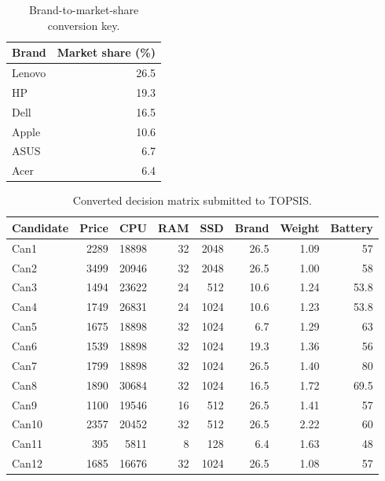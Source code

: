 \begin{table}[htbp]
  \centering
  \caption{Brand-to-market-share conversion key.}
  \label{tab:brand-share}
  \begin{tabular}{@{}lr@{}}
    \toprule
    Brand & Market share (\%) \\
    \midrule
    Lenovo & 26.5 \\
    HP     & 19.3 \\
    Dell   & 16.5 \\
    Apple  & 10.6 \\
    ASUS   & 6.7 \\
    Acer   & 6.4 \\
    \bottomrule
  \end{tabular}
\end{table}

\begin{table}[htbp]
\centering
\caption{Converted decision matrix submitted to TOPSIS.}
\label{tab:decision-matrix-converted}
\begin{tabular}{@{}lrrrrrrr@{}}
\toprule
Candidate & Price & CPU & RAM & SSD & Brand & Weight & Battery \\
\midrule
Can1  & 2289 & 18898 & 32 & 2048 & 26.5 & 1.09 & 57 \\
Can2  & 3499 & 20946 & 32 & 2048 & 26.5 & 1.00 & 58 \\
Can3  & 1494 & 23622 & 24 & 512 & 10.6 & 1.24 & 53.8 \\
Can4  & 1749 & 26831 & 24 & 1024 & 10.6 & 1.23 & 53.8 \\
Can5  & 1675 & 18898 & 32 & 1024 & 6.7 & 1.29 & 63 \\
Can6  & 1539 & 18898 & 32 & 1024 & 19.3 & 1.36 & 56 \\
Can7  & 1799 & 18898 & 32 & 1024 & 26.5 & 1.40 & 80 \\
Can8  & 1890 & 30684 & 32 & 1024 & 16.5 & 1.72 & 69.5 \\
Can9  & 1100 & 19546 & 16 & 512 & 26.5 & 1.41 & 57 \\
Can10 & 2357 & 20452 & 32 & 512 & 26.5 & 2.22 & 60 \\
Can11 & 395  & 5811 & 8 & 128 & 6.4 & 1.63 & 48 \\
Can12 & 1685 & 16676 & 32 & 1024 & 26.5 & 1.08 & 57 \\
\bottomrule
\end{tabular}
\end{table}

